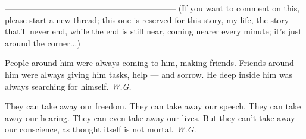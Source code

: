 --------------------------------------------------------------
(If you want to comment on this, please start a new thread; this one is reserved for this story, my life, the story that'll never end, while the end is still near, coming nearer every minute; it's just around the corner...)

People 
around him 
were always coming to him, 
making friends. 
Friends 
around him 
were always giving him tasks, 
help --- and sorrow. 
He 
deep inside him 
was always searching 
for himself. 
\emph{W.G.}

They 
can take away our freedom. 
They 
can take away our speech. 
They 
can take away our hearing. 
They 
can even take away our lives. 
But they 
can't take away our conscience, 
as thought itself is not mortal. 
\emph{W.G.}

